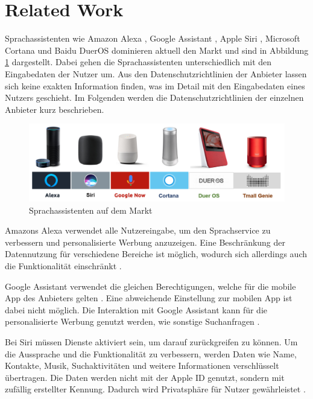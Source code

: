 \section{Related Work}
Sprachassistenten wie Amazon Alexa \cite{alexaAssitent}, Google Assistant \cite{googleAssistant}, Apple Siri \cite{siriAssistent}, Microsoft Cortana \cite{cortanaAssistent} und Baidu DuerOS \cite{baiduAssistant} dominieren aktuell den Markt und sind in Abbildung \ref{fig:sprachassistenten} dargestellt. Dabei gehen die Sprachassistenten unterschiedlich mit den Eingabedaten der Nutzer um. Aus den Datenschutzrichtlinien der Anbieter lassen sich keine exakten Information finden, was im Detail mit den Eingabedaten eines Nutzers geschieht. Im Folgenden werden die Datenschutzrichtlinien der einzelnen Anbieter kurz beschrieben.

\begin{figure}[h!]
	\centering
	\includegraphics[width=1\linewidth]{Picture/Sprachassistenten}
	\caption[Sprachassistenten auf dem Markt\cite{homeAssistants}]{Sprachassistenten auf dem Markt\cite{homeAssistants}}
	\label{fig:sprachassistenten}
\end{figure}

Amazons Alexa verwendet alle Nutzereingabe, um den Sprachservice zu verbessern und personalisierte Werbung anzuzeigen. Eine Beschränkung der Datennutzung für verschiedene Bereiche ist möglich, wodurch sich allerdings auch die Funktionalität einschränkt \cite{alexaPrivacy}.

Google Assistant verwendet die gleichen Berechtigungen, welche für die mobile App des Anbieters gelten \cite{googleShare}. Eine abweichende Einstellung zur mobilen App ist dabei nicht möglich. Die Interaktion mit Google Assistant kann für die personalisierte Werbung genutzt werden, wie sonstige Suchanfragen \cite{googlePrivacy}.

Bei Siri müssen Dienste aktiviert sein, um darauf zurückgreifen zu können. Um die Aussprache und die Funktionalität zu verbessern, werden Daten wie Name, Kontakte, Musik, Suchaktivitäten und weitere Informationen verschlüsselt übertragen. Die Daten werden nicht mit der Apple ID genutzt, sondern mit zufällig erstellter Kennung. Dadurch wird Privatsphäre für Nutzer gewährleistet \cite{siriPrivacy}.

